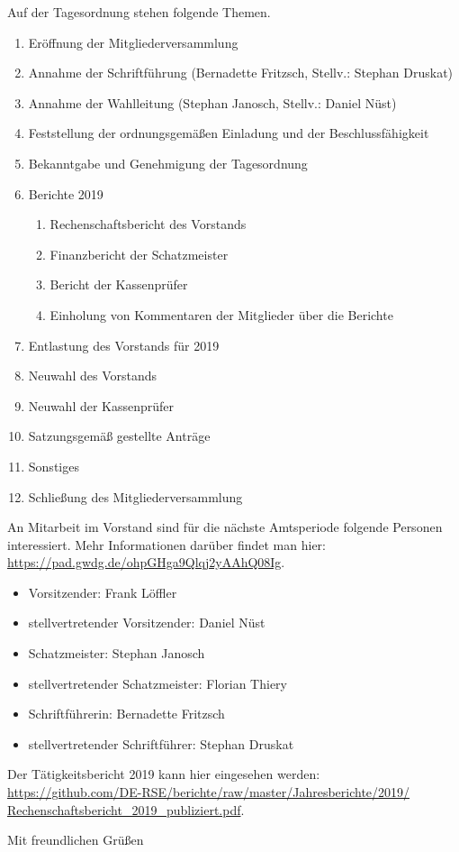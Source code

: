 \documentclass[../Vorlagen/de-RSE_Brief,a4paper]{scrlttr2}
\begin{document}
\begin{letter}{\mbox{}
}
\clearpage
\vspace{2em}
Auf der Tagesordnung stehen folgende Themen.
\begin{enumerate}
\setlength\itemsep{0em}
\item Eröffnung der Mitgliederversammlung
\item Annahme der Schriftführung (Bernadette Fritzsch, Stellv.: Stephan Druskat)
\item Annahme der Wahlleitung (Stephan Janosch, Stellv.: Daniel Nüst)
\item Feststellung der ordnungsgemäßen Einladung und der Beschlussfähigkeit
\item Bekanntgabe und Genehmigung der Tagesordnung
\item Berichte 2019
\begin{enumerate}
 \item Rechenschaftsbericht des Vorstands
 \item Finanzbericht der Schatzmeister
 \item Bericht der Kassenprüfer
 \item Einholung von Kommentaren der Mitglieder über die Berichte
\end{enumerate}
\item Entlastung des Vorstands für 2019
\item Neuwahl des Vorstands
\item Neuwahl der Kassenprüfer
\item Satzungsgemäß gestellte Anträge
\item Sonstiges
\item Schließung des Mitgliederversammlung
\end{enumerate}

\clearpage
An Mitarbeit im Vorstand sind für die nächste Amtsperiode folgende Personen interessiert. Mehr Informationen darüber findet man hier:\\
\href{https://pad.gwdg.de/ohpGHga9Qlqj2yAAhQ08Ig}{https://pad.gwdg.de/ohpGHga9Qlqj2yAAhQ08Ig}.
\begin{itemize}
 \item Vorsitzender: Frank Löffler
 \item stellvertretender Vorsitzender: Daniel Nüst
 \item Schatzmeister: Stephan Janosch
 \item stellvertretender Schatzmeister: Florian Thiery
 \item Schriftführerin: Bernadette Fritzsch
 \item stellvertretender Schriftführer: Stephan Druskat
\end{itemize}
Der Tätigkeitsbericht 2019 kann hier eingesehen werden:\\
\href{https://github.com/DE-RSE/berichte/raw/master/Jahresberichte/2019/Rechenschaftsbericht_2019_publiziert.pdf}{https://github.com/DE-RSE/berichte/raw/master/Jahresberichte/2019/\\Rechenschaftsbericht\_2019\_publiziert.pdf}.

\closing{Mit freundlichen Grüßen}
\end{letter}
\end{document}
